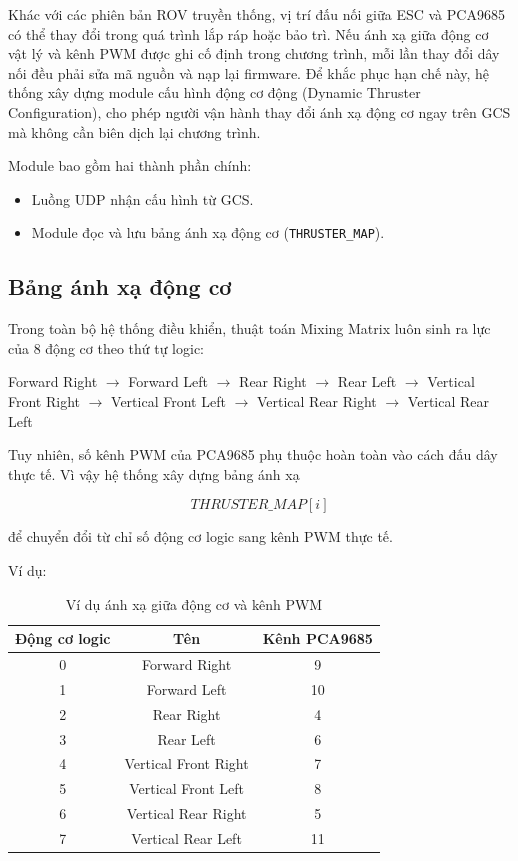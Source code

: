 \documentclass[../DoAn.tex]{subfiles}
\begin{document}
Khác với các phiên bản ROV truyền thống, vị trí đấu nối giữa ESC và
PCA9685 có thể thay đổi trong quá trình lắp ráp hoặc bảo trì. Nếu ánh
xạ giữa động cơ vật lý và kênh PWM được ghi cố định trong chương trình,
mỗi lần thay đổi dây nối đều phải sửa mã nguồn và nạp lại firmware.
Để khắc phục hạn chế này, hệ thống xây dựng module cấu hình động cơ
động (Dynamic Thruster Configuration), cho phép người vận hành thay
đổi ánh xạ động cơ ngay trên GCS mà không cần biên dịch lại chương
trình.

Module bao gồm hai thành phần chính:

\begin{itemize}
    \item Luồng UDP nhận cấu hình từ GCS.
    \item Module đọc và lưu bảng ánh xạ động cơ (\texttt{THRUSTER\_MAP}).
\end{itemize}

\subsection{Bảng ánh xạ động cơ}

Trong toàn bộ hệ thống điều khiển, thuật toán Mixing Matrix luôn sinh
ra lực của 8 động cơ theo thứ tự logic:

\begin{center}
Forward Right $\rightarrow$
Forward Left $\rightarrow$
Rear Right $\rightarrow$
Rear Left $\rightarrow$
Vertical Front Right $\rightarrow$
Vertical Front Left $\rightarrow$
Vertical Rear Right $\rightarrow$
Vertical Rear Left
\end{center}

Tuy nhiên, số kênh PWM của PCA9685 phụ thuộc hoàn toàn vào cách đấu
dây thực tế. Vì vậy hệ thống xây dựng bảng ánh xạ

\begin{equation}
THRUSTER\_MAP[i]
\end{equation}

để chuyển đổi từ chỉ số động cơ logic sang kênh PWM thực tế.

Ví dụ:

\begin{table}[H]
\centering
\renewcommand{\arraystretch}{1.3}
\begin{tabular}{|c|c|c|}
\hline
\textbf{Động cơ logic} & \textbf{Tên} & \textbf{Kênh PCA9685} \\
\hline
0 & Forward Right & 9 \\
1 & Forward Left & 10 \\
2 & Rear Right & 4 \\
3 & Rear Left & 6 \\
4 & Vertical Front Right & 7 \\
5 & Vertical Front Left & 8 \\
6 & Vertical Rear Right & 5 \\
7 & Vertical Rear Left & 11 \\
\hline
\end{tabular}
\caption{Ví dụ ánh xạ giữa động cơ và kênh PWM}
\end{table}
\end{document}
